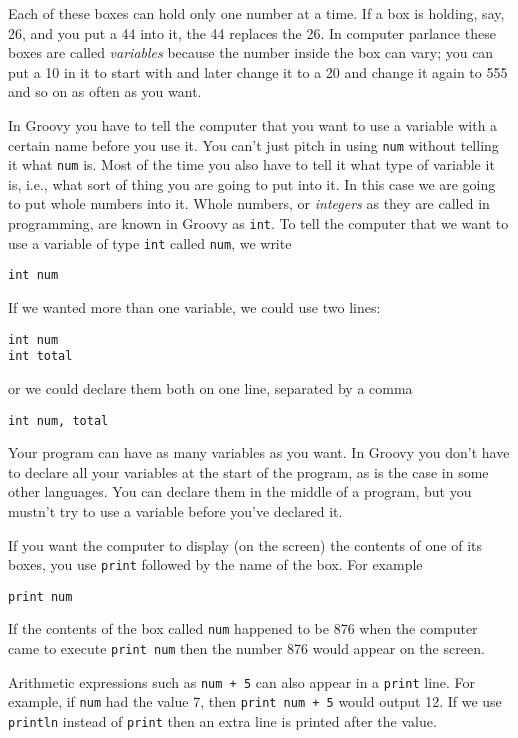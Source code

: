Each of these boxes can hold only one number at a time.  If a box is
holding, say, 26, and you put a 44 into it, the 44 replaces the 26.
In computer parlance these boxes are called \emph{variables}
because the number inside the box can vary; you can put a 10 in it to
start with and later change it to a 20 and change it again to 555
and so on as often as you want.

In Groovy you have to tell the computer that you want to use a variable
with a certain name before you use it.  You can't just pitch in using \verb!num!
without telling it what \verb!num! is.  Most of the time you also have to
tell it what type of variable it is, i.e., what sort of thing you are going
to put into it.  In this case we are going to put whole numbers into it.
Whole numbers, or \emph{integers} as they are called in programming, are
known in Groovy as \verb!int!.  To tell the computer that we want to use a
variable of type \verb!int! called \verb!num!, we write
\begin{Verbatim}
int num
\end{Verbatim}
If we wanted more than one variable, we could use two lines:
\begin{Verbatim}
int num
int total
\end{Verbatim}
or we could declare them both on one line, separated by a comma
\begin{Verbatim}
int num, total
\end{Verbatim}
Your program can have as many variables as you want.  In Groovy you don't
have to declare all your variables at the start of the program, as is the
case in some other languages.  You can declare them in the middle of a
program, but you mustn't try to use a variable before you've declared it.

If you want the computer to display (on the screen) the contents of one of
its boxes, you use \verb!print! followed by the name
of the box.  For example
\begin{Verbatim}
print num
\end{Verbatim}
If the contents of the box called \verb!num! happened to be 876 when the
computer came to execute \verb!print num! then the number 876 would appear
on the screen.  

Arithmetic expressions such as \verb!num + 5! can also appear in a \verb!print!
line.  For example, if \verb!num! had the value 7, then \verb!print num + 5!
would output 12.
If we use \verb!println! instead of \verb!print! then an extra line is printed after the value.

